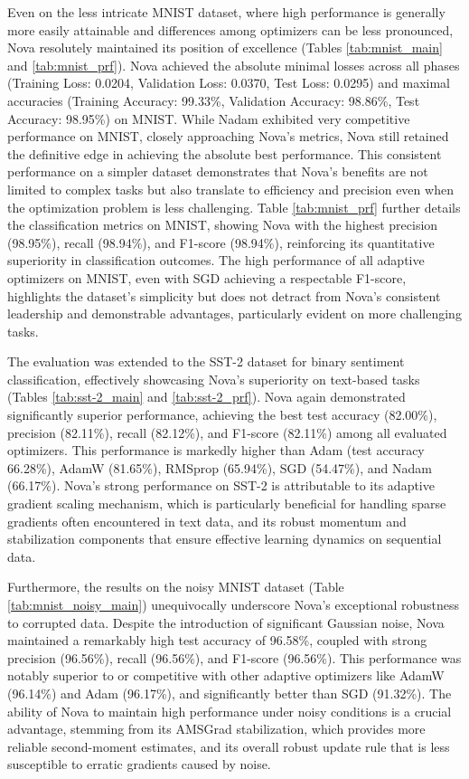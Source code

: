 \documentclass{article}
\begin{document}
Even on the less intricate MNIST dataset, where high performance is generally more easily attainable and differences among optimizers can be less pronounced, Nova resolutely maintained its position of excellence (Tables \ref{tab:mnist_main} and \ref{tab:mnist_prf}). Nova achieved the absolute minimal losses across all phases (Training Loss: 0.0204, Validation Loss: 0.0370, Test Loss: 0.0295) and maximal accuracies (Training Accuracy: 99.33\%, Validation Accuracy: 98.86\%, Test Accuracy: 98.95\%) on MNIST. While Nadam exhibited very competitive performance on MNIST, closely approaching Nova's metrics, Nova still retained the definitive edge in achieving the absolute best performance. This consistent performance on a simpler dataset demonstrates that Nova's benefits are not limited to complex tasks but also translate to efficiency and precision even when the optimization problem is less challenging. Table \ref{tab:mnist_prf} further details the classification metrics on MNIST, showing Nova with the highest precision (98.95\%), recall (98.94\%), and F1-score (98.94\%), reinforcing its quantitative superiority in classification outcomes. The high performance of all adaptive optimizers on MNIST, even with SGD achieving a respectable F1-score, highlights the dataset's simplicity but does not detract from Nova's consistent leadership and demonstrable advantages, particularly evident on more challenging tasks.

The evaluation was extended to the SST-2 dataset for binary sentiment classification, effectively showcasing Nova's superiority on text-based tasks (Tables \ref{tab:sst-2_main} and \ref{tab:sst-2_prf}). Nova again demonstrated significantly superior performance, achieving the best test accuracy (82.00\%), precision (82.11\%), recall (82.12\%), and F1-score (82.11\%) among all evaluated optimizers. This performance is markedly higher than Adam (test accuracy 66.28\%), AdamW (81.65\%), RMSprop (65.94\%), SGD (54.47\%), and Nadam (66.17\%). Nova's strong performance on SST-2 is attributable to its adaptive gradient scaling mechanism, which is particularly beneficial for handling sparse gradients often encountered in text data, and its robust momentum and stabilization components that ensure effective learning dynamics on sequential data.

Furthermore, the results on the noisy MNIST dataset (Table \ref{tab:mnist_noisy_main}) unequivocally underscore Nova's exceptional robustness to corrupted data. Despite the introduction of significant Gaussian noise, Nova maintained a remarkably high test accuracy of 96.58\%, coupled with strong precision (96.56\%), recall (96.56\%), and F1-score (96.56\%). This performance was notably superior to or competitive with other adaptive optimizers like AdamW (96.14\%) and Adam (96.17\%), and significantly better than SGD (91.32\%). The ability of Nova to maintain high performance under noisy conditions is a crucial advantage, stemming from its AMSGrad stabilization, which provides more reliable second-moment estimates, and its overall robust update rule that is less susceptible to erratic gradients caused by noise.
\end{document}
